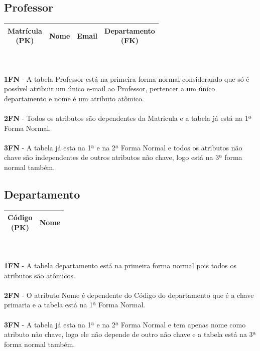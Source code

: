 \documentclass[12pt]{article}
\begin{document}
\subsection*{Professor}
\begin{tabular}{|c|c|c|c|}
    \hline
    \makecell{Matrícula \\(PK)} & Nome & Email & \makecell{Departamento \\(FK)} \\
    \hline
\end{tabular}
\\
\\
\textbf{1FN} - A tabela Professor está na primeira forma normal considerando que só é possível atribuir um único e-mail ao Professor, pertencer a um único departamento e nome é um atributo atômico. \\
\\
\textbf{2FN} - Todos os atributos são dependentes da Matricula e a tabela já está na 1ª Forma Normal. \\
\\
\textbf{3FN} - A tabela já esta na 1ª e na 2ª Forma Normal e todos os atributos não chave são independentes de outros atributos não chave, logo está na 3ª forma normal também.

\subsection*{Departamento}
\begin{tabular}{|c|c|}
    \hline
    \makecell{Código \\(PK)} & Nome \\
    \hline
\end{tabular}
\\
\\
\textbf{1FN} - A tabela departamento está na primeira forma normal pois todos os atributos são atômicos. \\
\\
\textbf{2FN} - O atributo Nome é dependente do Código do departamento que é a chave primaria e a tabela está na 1ª Forma Normal. \\
\\
\textbf{3FN} - A tabela já esta na 1ª e na 2ª Forma Normal e tem apenas nome como atributo não chave, logo ele não depende de outro não chave e a tabela está na 3ª forma normal também.
\end{document}
